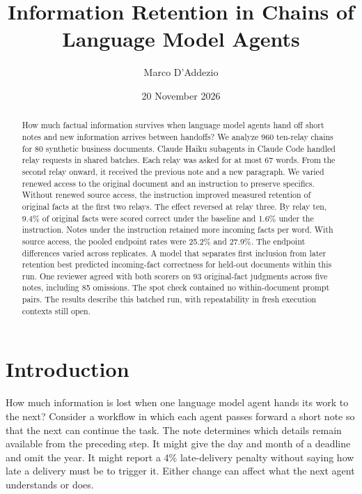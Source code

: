 \documentclass[10pt,letterpaper]{amsart}
\numberwithin{equation}{section}
\begin{document}
\title[Information retention in agent chains]{Information Retention in Chains of Language Model Agents}
\author{Marco D'Addezio}
\date{20 November 2026}

\begin{abstract}
How much factual information survives when language model agents hand off short notes
and new information arrives between handoffs? We analyze 960 ten-relay chains for
80 synthetic business documents. Claude Haiku subagents in Claude Code handled relay
requests in shared batches. Each relay was asked for at most 67 words. From the second
relay onward, it received the previous note and a new paragraph. We varied renewed
access to the original document and an instruction to preserve specifics. Without
renewed source access, the instruction improved measured retention of original facts
at the first two relays. The effect reversed at relay three. By relay ten, 9.4\% of
original facts were scored correct under the baseline and 1.6\% under the instruction.
Notes under the instruction retained more incoming facts per word. With source access,
the pooled endpoint rates were 25.2\% and 27.9\%. The endpoint differences varied across
replicates. A model that separates first inclusion from later retention best predicted
incoming-fact correctness for held-out documents within this run. One reviewer agreed
with both scorers on 93 original-fact judgments across five notes, including 85 omissions.
The spot check contained no within-document prompt pairs. The results describe this
batched run, with repeatability in fresh execution contexts still open.
\end{abstract}
\maketitle

{\small\tableofcontents}

\section{Introduction}
\label{sec:introduction}

How much information is lost when one language model agent hands its work to the next?
Consider a workflow in which each agent passes forward a short note so that the next can
continue the task. The note determines which details remain available from the preceding
step. It might give the day and month of a deadline and omit the year. It might report a
4\% late-delivery penalty without saying how late a delivery must be to trigger it. Either
change can affect what the next agent understands or does.
\end{document}
